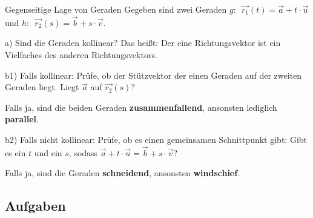 \begin{rezept}{Gegenseitige Lage von Geraden}{}
Gegeben sind zwei Geraden $g:\,\,\, \vec{r_1}(t) = \vec{a} +
t\cdot{}\vec{u}$ und $h:\,\,\, \vec{r_2}(s) = \vec{b} +
s\cdot{}\vec{v}$.

a) Sind die Geraden kollinear? Das heißt: Der eine Richtungsvektor ist
ein Vielfaches des anderen Richtungsvektors.

b1) Falls kollinear:
 Prüfe, ob der Stützvektor der einen Geraden auf der zweiten Geraden
 liegt. Liegt $\vec{a}$ auf $\vec{r_2}(s)$?

 Falls ja, sind die beiden Geraden \textbf{zusammenfallend}, ansonsten
 lediglich \textbf{parallel}.

 b2) Falls nicht kollinear:
 Prüfe, ob es einen gemeinsamen Schnittpunkt gibt:
 Gibt es ein $t$ und ein $s$, sodass $\vec{a} + t\cdot{} \vec{u} =
 \vec{b} + s\cdot{} \vec{v}$?

 Falls ja, sind die Geraden \textbf{schneidend}, ansonsten \textbf{windschief}.

\end{rezept}


\newpage


\subsection*{Aufgaben}



\newpage
